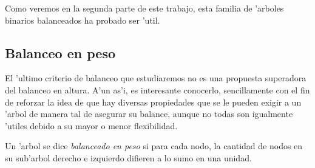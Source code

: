 Como veremos en la segunda parte de este trabajo, esta familia de 'arboles binarios balanceados ha probado ser 'util.

\subsection{Balanceo en peso}

El 'ultimo criterio de balanceo que estudiaremos no es una propuesta superadora del balanceo en altura. A'un as'i, es interesante conocerlo, sencillamente con el fin de reforzar la idea de que hay diversas propiedades que se le pueden exigir a un 'arbol de manera tal de asegurar su balance, aunque no todas son igualmente 'utiles debido a su mayor o menor flexibilidad.

\begin{defi}
	Un 'arbol se dice \textit{balanceado en peso} si para cada nodo, la cantidad de nodos en su sub'arbol derecho e izquierdo difieren a lo sumo en una unidad.
\end{defi}

